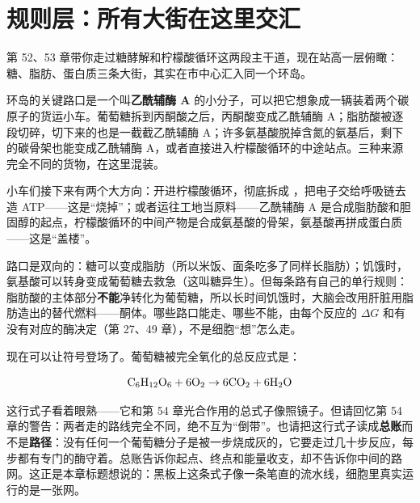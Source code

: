 \section{规则层：所有大街在这里交汇}

第 52、53 章带你走过糖酵解和柠檬酸循环这两段主干道，现在站高一层俯瞰：糖、脂肪、蛋白质三条大街，其实在市中心汇入同一个环岛。

环岛的关键路口是一个叫\textbf{乙酰辅酶 A} 的小分子，可以把它想象成一辆装着两个碳原子的货运小车。葡萄糖拆到丙酮酸之后，丙酮酸变成乙酰辅酶 A；脂肪酸被逐段切碎，切下来的也是一截截乙酰辅酶 A；许多氨基酸脱掉含氮的氨基后，剩下的碳骨架也能变成乙酰辅酶 A，或者直接进入柠檬酸循环的中途站点。三种来源完全不同的货物，在这里混装。

小车们接下来有两个大方向：开进柠檬酸循环，彻底拆成 ，把电子交给呼吸链去造 ATP——这是“烧掉”；或者运往工地当原料——乙酰辅酶 A 是合成脂肪酸和胆固醇的起点，柠檬酸循环的中间产物是合成氨基酸的骨架，氨基酸再拼成蛋白质——这是“盖楼”。

路口是双向的：糖可以变成脂肪（所以米饭、面条吃多了同样长脂肪）；饥饿时，氨基酸可以转身变成葡萄糖去救急（这叫糖异生）。但每条路有自己的单行规则：脂肪酸的主体部分\textbf{不能}净转化为葡萄糖，所以长时间饥饿时，大脑会改用肝脏用脂肪造出的替代燃料——酮体。哪些路口能走、哪些不能，由每个反应的 $\Delta G$ 和有没有对应的酶决定（第 27、49 章），不是细胞“想”怎么走。

现在可以让符号登场了。葡萄糖被完全氧化的总反应式是：

\[\mathrm{C_6H_{12}O_6} + \mathrm{6O_2} \rightarrow \mathrm{6CO_2} + \mathrm{6H_2O}\]

这行式子看着眼熟——它和第 54 章光合作用的总式子像照镜子。但请回忆第 54 章的警告：两者走的路线完全不同，绝不互为“倒带”。也请把这行式子读成\textbf{总账}而不是\textbf{路径}：没有任何一个葡萄糖分子是被一步烧成灰的，它要走过几十步反应，每步都有专门的酶守着。总账告诉你起点、终点和能量收支，却不告诉你中间的路网。这正是本章标题想说的：黑板上这条式子像一条笔直的流水线，细胞里真实运行的是一张网。

\begin{center}
\end{center}

